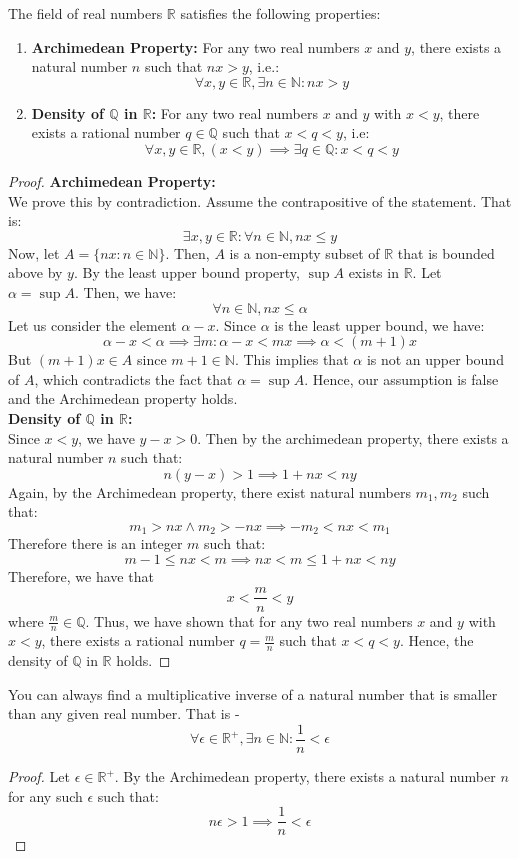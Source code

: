 \documentclass[openany]{book}
\numberwithin{equation}{section}
\begin{document}
    The field of real numbers $\mathbb{R}$ satisfies the following properties:
    \begin{enumerate}
        \item \textbf{Archimedean Property:} For any two real numbers $x$ and $y$, there exists a natural number $n$ such that $nx>y$, i.e.:
        $$\forall x, y \in \mathbb{R}, \exists n \in \mathbb{N}: nx >y$$
        \item \textbf{Density of $\mathbb{Q}$ in $\mathbb{R}$:} For any two real numbers $x$ and $y$ with $x < y$, there exists a rational number $q \in \mathbb{Q}$ such that $x < q < y$, i.e: 
        $$\forall x, y \in \mathbb{R}, (x < y) \implies \exists q \in \mathbb{Q}: x < q < y$$
    \end{enumerate}
\par
\begin{proof}
\textbf{Archimedean Property:} \\
We prove this by contradiction. Assume the contrapositive of the statement. That is: 
$$\exists x, y \in \mathbb{R}: \forall n \in \mathbb{N}, nx \leq y$$
Now, let $A = \{nx: n \in \mathbb{N}\}$. Then, $A$ is a non-empty subset of $\mathbb{R}$ that is bounded above by $y$. By the least upper bound property, $\sup A$ exists in $\mathbb{R}$. Let $\alpha = \sup A$. Then, we have:
$$\forall n \in \mathbb{N}, nx \leq \alpha$$ 
Let us consider the element $\alpha - x$. Since $\alpha$ is the least upper bound, we have:
$$\alpha - x < \alpha \implies \exists m: \alpha - x < mx \implies \alpha < (m+1)x$$
But $(m+1)x \in A$ since $m+1 \in \mathbb{N}$. This implies that $\alpha$ is not an upper bound of $A$, which contradicts the fact that $\alpha = \sup A$. Hence, our assumption is false and the Archimedean property holds. \\
\textbf{Density of $\mathbb{Q}$ in $\mathbb{R}$:} \\
Since $x < y$, we have $y - x >0$. Then by the archimedean property, there exists a natural number $n$ such that:
$$n(y - x) > 1 \implies 1 + nx < ny$$
Again, by the Archimedean property, there exist natural numbers $m_1, m_2$ such that:
$$m_1 > nx \wedge m_2 > -nx \implies -m_2 < nx < m_1$$
Therefore there is an integer $m$ such that: 
$$m-1 \leq nx < m \implies nx < m \leq 1 + nx < ny$$
Therefore, we have that $$x < \frac{m}{n} < y$$
where $\frac{m}{n} \in \mathbb{Q}$. Thus, we have shown that for any two real numbers $x$ and $y$ with $x < y$, there exists a rational number $q = \frac{m}{n}$ such that $x < q < y$. Hence, the density of $\mathbb{Q}$ in $\mathbb{R}$ holds.
\end{proof}
\begin{corollary}
    You can always find a multiplicative inverse of a natural number that is smaller than any given real number. That is - 
    $$\forall \epsilon \in \mathbb{R}^{+}, \exists n \in \mathbb{N}: \frac{1}{n} < \epsilon$$
\end{corollary}
\begin{proof}
Let $\epsilon \in \mathbb{R}^{+}$. By the Archimedean property, there exists a natural number $n$ for any such $\epsilon$ such that:
$$n\epsilon > 1 \implies \frac{1}{n} < \epsilon$$

\end{proof}
\end{document}
